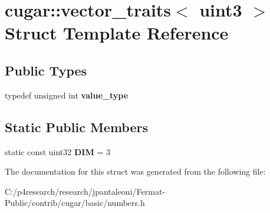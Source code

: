 \hypertarget{structcugar_1_1vector__traits_3_01uint3_01_4}{}\section{cugar\+:\+:vector\+\_\+traits$<$ uint3 $>$ Struct Template Reference}
\label{structcugar_1_1vector__traits_3_01uint3_01_4}
\subsection*{Public Types}
\begin{DoxyCompactItemize}
\item 
\mbox{\label{structcugar_1_1vector__traits_3_01uint3_01_4_a328d27066d2c409d6db26d80618b3235}} 
typedef unsigned int {\bfseries value\+\_\+type}
\end{DoxyCompactItemize}
\subsection*{Static Public Members}
\begin{DoxyCompactItemize}
\item 
\mbox{\label{structcugar_1_1vector__traits_3_01uint3_01_4_a1d6a2d613bb3805420efb47a7a59198d}} 
static const uint32 {\bfseries D\+IM} = 3
\end{DoxyCompactItemize}


The documentation for this struct was generated from the following file\+:\begin{DoxyCompactItemize}
\item 
C\+:/p4research/research/jpantaleoni/\+Fermat-\/\+Public/contrib/cugar/basic/numbers.\+h\end{DoxyCompactItemize}
